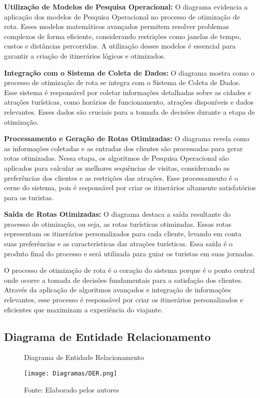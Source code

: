    \textbf{Utilização de Modelos de Pesquisa Operacional:} O diagrama evidencia a aplicação dos modelos de Pesquisa Operacional no processo de otimização de rota. Esses modelos matemáticos avançados permitem resolver problemas complexos de forma eficiente, considerando restrições como janelas de tempo, custos e distâncias percorridas. A utilização desses modelos é essencial para garantir a criação de itinerários lógicos e otimizados.

    \textbf{Integração com o Sistema de Coleta de Dados:} O diagrama mostra como o processo de otimização de rota se integra com o Sistema de Coleta de Dados. Esse sistema é responsável por coletar informações detalhadas sobre as cidades e atrações turísticas, como horários de funcionamento, atrações disponíveis e dados relevantes. Esses dados são cruciais para a tomada de decisões durante a etapa de otimização.

    \textbf{Processamento e Geração de Rotas Otimizadas:} O diagrama revela como as informações coletadas e as entradas dos clientes são processadas para gerar rotas otimizadas. Nessa etapa, os algoritmos de Pesquisa Operacional são aplicados para calcular as melhores sequências de visitas, considerando as preferências dos clientes e as restrições das atrações. Esse processamento é o cerne do sistema, pois é responsável por criar os itinerários altamente satisfatórios para os turistas.

    \textbf{Saída de Rotas Otimizadas:} O diagrama destaca a saída resultante do processo de otimização, ou seja, as rotas turísticas otimizadas. Essas rotas representam os itinerários personalizados para cada cliente, levando em conta suas preferências e as características das atrações turísticas. Essa saída é o produto final do processo e será utilizada para guiar os turistas em suas jornadas.

O processo de otimização de rota é o coração do sistema porque é o ponto central onde ocorre a tomada de decisões fundamentais para a satisfação dos clientes. Através da aplicação de algoritmos avançados e integração de informações relevantes, esse processo é responsável por criar os itinerários personalizados e eficientes que maximizam a experiência do viajante.

\subsection{Diagrama de Entidade Relacionamento}

\begin{figure}[H]
    \centering
    \caption{Diagrama de Entidade Relacionamento}
    \label{fig:DER}
    \texttt{[image: Diagramas/DER.png]}\\
    \caption*{Fonte: Elaborado pelos autores}
\end{figure}

